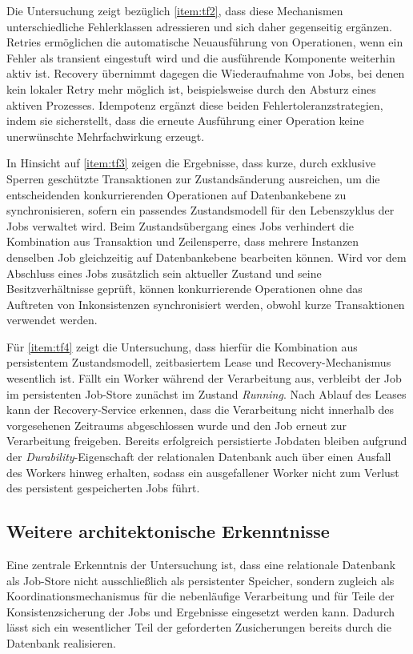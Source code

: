 Die Untersuchung zeigt bezüglich \ref{item:tf2}, dass diese Mechanismen unterschiedliche Fehlerklassen adressieren und sich daher gegenseitig ergänzen.
Retries ermöglichen die automatische Neuausführung von Operationen, wenn ein Fehler als transient eingestuft wird und die
ausführende Komponente weiterhin aktiv ist.
Recovery übernimmt dagegen die Wiederaufnahme von Jobs, bei denen kein lokaler Retry mehr möglich ist, beispielsweise durch
den Absturz eines aktiven Prozesses.
Idempotenz ergänzt diese beiden Fehlertoleranzstrategien, indem sie sicherstellt, dass die erneute Ausführung einer Operation
keine unerwünschte Mehrfachwirkung erzeugt.

In Hinsicht auf \ref{item:tf3} zeigen die Ergebnisse, dass kurze, durch exklusive Sperren geschützte Transaktionen zur Zustandsänderung
ausreichen, um die entscheidenden konkurrierenden Operationen auf Datenbankebene zu synchronisieren, sofern ein passendes
Zustandsmodell für den Lebenszyklus der Jobs verwaltet wird.
Beim Zustandsübergang eines Jobs verhindert die Kombination aus Transaktion und Zeilensperre, dass mehrere Instanzen denselben
Job gleichzeitig auf Datenbankebene bearbeiten können.
Wird vor dem Abschluss eines Jobs zusätzlich sein aktueller Zustand und seine Besitzverhältnisse geprüft, können konkurrierende
Operationen ohne das Auftreten von Inkonsistenzen synchronisiert werden, obwohl kurze Transaktionen verwendet werden.

Für \ref{item:tf4} zeigt die Untersuchung, dass hierfür die Kombination aus persistentem Zustandsmodell, zeitbasiertem Lease
und Recovery-Mechanismus wesentlich ist.
Fällt ein Worker während der Verarbeitung aus, verbleibt der Job im persistenten Job-Store zunächst im Zustand \textit{Running}.
Nach Ablauf des Leases kann der Recovery-Service erkennen, dass die Verarbeitung nicht innerhalb des vorgesehenen Zeitraums
abgeschlossen wurde und den Job erneut zur Verarbeitung freigeben.
Bereits erfolgreich persistierte Jobdaten bleiben aufgrund der \textit{Durability}-Eigenschaft der relationalen Datenbank auch über
einen Ausfall des Workers hinweg erhalten, sodass ein ausgefallener Worker nicht zum Verlust des persistent gespeicherten Jobs führt.

\subsection{Weitere architektonische Erkenntnisse}
\label{subsec:weitereErkenntnisse}
Eine zentrale Erkenntnis der Untersuchung ist, dass eine relationale Datenbank als Job-Store nicht ausschließlich als
persistenter Speicher, sondern zugleich als Koordinationsmechanismus für die nebenläufige Verarbeitung und für Teile der
Konsistenzsicherung der Jobs und Ergebnisse eingesetzt werden kann.
Dadurch lässt sich ein wesentlicher Teil der geforderten Zusicherungen bereits durch die Datenbank realisieren.

